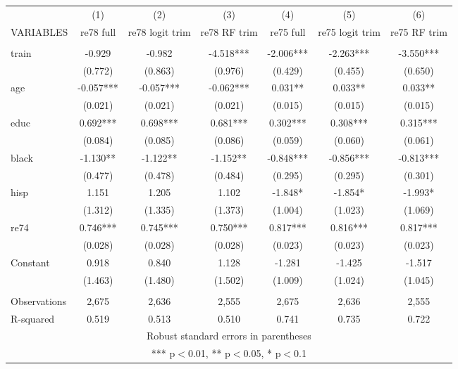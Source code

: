 \documentclass[]{article}
\begin{document}
\begin{tabular}{lcccccc} \hline
 & (1) & (2) & (3) & (4) & (5) & (6) \\
VARIABLES & re78 full & re78 logit trim & re78 RF trim & re75 full & re75 logit trim & re75 RF trim \\ \hline
 &  &  &  &  &  &  \\
train & -0.929 & -0.982 & -4.518*** & -2.006*** & -2.263*** & -3.550*** \\
 & (0.772) & (0.863) & (0.976) & (0.429) & (0.455) & (0.650) \\
age & -0.057*** & -0.057*** & -0.062*** & 0.031** & 0.033** & 0.033** \\
 & (0.021) & (0.021) & (0.021) & (0.015) & (0.015) & (0.015) \\
educ & 0.692*** & 0.698*** & 0.681*** & 0.302*** & 0.308*** & 0.315*** \\
 & (0.084) & (0.085) & (0.086) & (0.059) & (0.060) & (0.061) \\
black & -1.130** & -1.122** & -1.152** & -0.848*** & -0.856*** & -0.813*** \\
 & (0.477) & (0.478) & (0.484) & (0.295) & (0.295) & (0.301) \\
hisp & 1.151 & 1.205 & 1.102 & -1.848* & -1.854* & -1.993* \\
 & (1.312) & (1.335) & (1.373) & (1.004) & (1.023) & (1.069) \\
re74 & 0.746*** & 0.745*** & 0.750*** & 0.817*** & 0.816*** & 0.817*** \\
 & (0.028) & (0.028) & (0.028) & (0.023) & (0.023) & (0.023) \\
Constant & 0.918 & 0.840 & 1.128 & -1.281 & -1.425 & -1.517 \\
 & (1.463) & (1.480) & (1.502) & (1.009) & (1.024) & (1.045) \\
 &  &  &  &  &  &  \\
Observations & 2,675 & 2,636 & 2,555 & 2,675 & 2,636 & 2,555 \\
 R-squared & 0.519 & 0.513 & 0.510 & 0.741 & 0.735 & 0.722 \\ \hline
\multicolumn{7}{c}{ Robust standard errors in parentheses} \\
\multicolumn{7}{c}{ *** p$<$0.01, ** p$<$0.05, * p$<$0.1} \\
\end{tabular}
\end{document}
